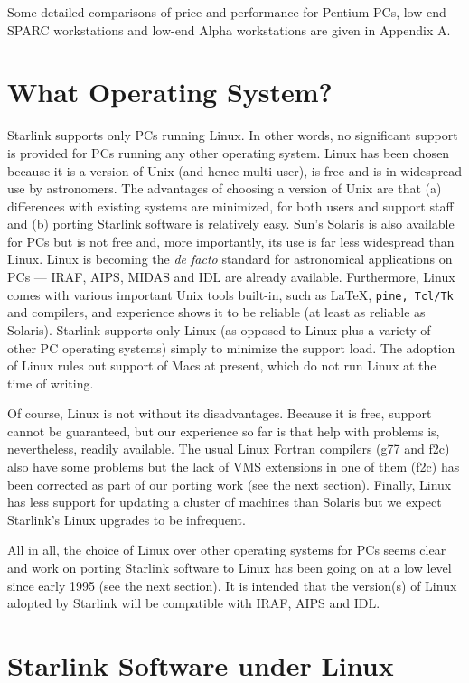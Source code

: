 Some detailed comparisons of price and performance for Pentium PCs,
low-end SPARC workstations and low-end Alpha workstations are given in
Appendix A.


\section{What Operating System?}

Starlink supports only PCs running Linux.  In other
words, no significant support is provided for PCs
running any other operating system.  Linux
has been chosen because it is a version of Unix (and hence multi-user),
is free and is in widespread use by astronomers.   The advantages of
choosing a version of Unix are that (a)
differences with existing systems are minimized, for both users and
support staff and (b) porting Starlink software is relatively easy. Sun's
Solaris is also available for PCs but is not free and, more importantly,
its use is far less widespread than Linux. Linux is becoming the {\em
de facto} standard for astronomical applications on PCs --- IRAF, AIPS,
MIDAS and IDL are already available.   Furthermore, Linux comes with
various important Unix tools built-in, such as \LaTeX, {\tt pine, Tcl/Tk}
and compilers, and experience shows it to be reliable (at least as reliable
as Solaris).   Starlink supports only Linux
(as opposed to Linux plus a variety of other PC operating systems)
simply to minimize the support load.  The adoption of Linux rules out
support of Macs at present, which do not run Linux at the time of writing.

Of course, Linux is not without its disadvantages.  Because it is free,
support cannot be guaranteed, but our experience so far is that help
with problems is, nevertheless, readily available.  The usual Linux Fortran
compilers (g77 and f2c) also have some problems but the lack of VMS
extensions in one of them (f2c)  has been corrected as part of our
porting work (see the next section).  Finally, Linux has less support
for updating a cluster of machines than Solaris but we expect
Starlink's Linux upgrades to be infrequent.

All in all, the choice of Linux over other operating
systems for PCs seems clear and work on porting
Starlink software to Linux has been going on at a low level since
early 1995 (see the next section).   It is intended that the version(s)
of Linux adopted by Starlink will be compatible with IRAF, AIPS and IDL.

\section{Starlink Software under Linux}

